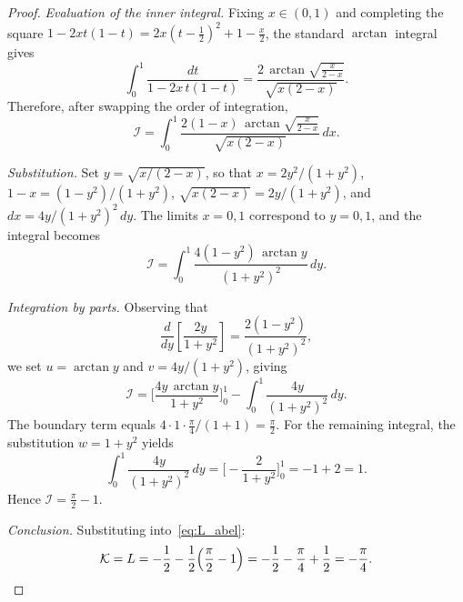 \documentclass[11pt,reqno]{amsart}
\theoremstyle{definition}
\begin{document}
\begin{proof}
\emph{Evaluation of the inner integral.}
Fixing $x\in(0,1)$ and completing the square $1{-}2xt(1{-}t)=2x(t{-}\tfrac12)^2+1{-}\tfrac{x}{2}$, the standard $\arctan$ integral gives
\begin{equation}\label{eq:inner_t}
  \int_0^1\frac{dt}{1-2x\,t(1-t)}
  =\frac{2\,\arctan\!\sqrt{\frac{x}{2-x}}}{\sqrt{x(2-x)}}.
\end{equation}
Therefore, after swapping the order of integration,
\begin{equation}\label{eq:I_single}
  \mathcal{I}=\int_0^1\frac{2(1-x)\,\arctan\!\sqrt{\frac{x}{2-x}}}{\sqrt{x(2-x)}}\,dx.
\end{equation}

\emph{Substitution.}
Set $y=\sqrt{x/(2-x)}$, so that $x=2y^2/(1+y^2)$, $1-x=(1-y^2)/(1+y^2)$, $\sqrt{x(2-x)}=2y/(1+y^2)$, and $dx=4y/(1+y^2)^2\,dy$. The limits $x=0,1$ correspond to $y=0,1$, and the integral becomes
\begin{equation}\label{eq:I_arctan}
  \mathcal{I}=\int_0^1\frac{4(1-y^2)\,\arctan y}{(1+y^2)^2}\,dy.
\end{equation}

\emph{Integration by parts.}
Observing that
\begin{equation}\label{eq:deriv_identity}
  \frac{d}{dy}\!\left[\frac{2y}{1+y^2}\right]=\frac{2(1-y^2)}{(1+y^2)^2},
\end{equation}
we set $u=\arctan y$ and $v=4y/(1+y^2)$, giving
\begin{equation}\label{eq:I_ibp}
  \mathcal{I}=\biggl[\frac{4y\,\arctan y}{1+y^2}\biggr]_0^1-\int_0^1\frac{4y}{(1+y^2)^2}\,dy.
\end{equation}
The boundary term equals $4\cdot 1\cdot\frac{\pi}{4}/(1+1)=\frac{\pi}{2}$.  For the remaining integral, the substitution $w=1+y^2$ yields
\begin{equation}\label{eq:remaining_integral}
  \int_0^1\frac{4y}{(1+y^2)^2}\,dy=\biggl[-\frac{2}{1+y^2}\biggr]_0^1=-1+2=1.
\end{equation}
Hence $\mathcal{I}=\frac{\pi}{2}-1$.

\emph{Conclusion.}
Substituting into~\eqref{eq:L_abel}:
\begin{equation}\label{eq:limit_final}
  \mathcal{K}=L=-\frac{1}{2}-\frac{1}{2}\!\left(\frac{\pi}{2}-1\right)=-\frac{1}{2}-\frac{\pi}{4}+\frac{1}{2}=-\frac{\pi}{4}.\qedhere
\end{equation}
\end{proof}

\end{document}
